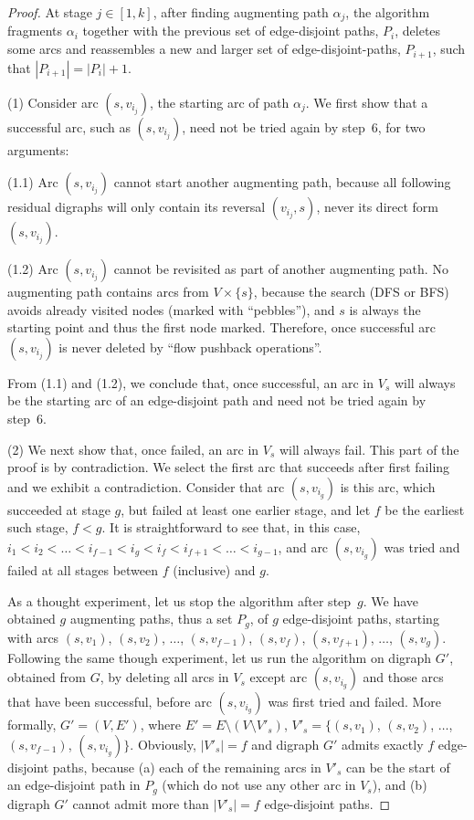 \documentclass[preliminary,copyright,creativecommons]{eptcs}
\theoremstyle{remark}
\begin{document}
\begin{proof}
At stage $j \in [1,k]$, after finding augmenting path $\alpha_j$, 
the algorithm fragments $\alpha_i$ 
together with the previous set of edge-disjoint paths, $P_i$, 
deletes some arcs and reassembles a new and larger set of edge-disjoint-paths, $P_{i+1}$,
such that $| P_{i+1} | = | P_i | + 1$.

(1) Consider arc $(s,v_{i_j})$, the starting arc of path $\alpha_j$.
We first show that a successful arc, such as $(s,v_{i_j})$, 
need not be tried again by step~6, for two arguments:

(1.1) Arc $(s,v_{i_j})$ cannot start another augmenting path, 
because all following residual digraphs will only contain 
its reversal $(v_{i_j},s)$, never its direct form $(s,v_{i_j})$.

(1.2) Arc $(s,v_{i_j})$ cannot be revisited as part of another augmenting path.
No augmenting path contains arcs from $V \times \{s\}$, 
because the search (DFS or BFS) avoids already visited nodes (marked with ``pebbles''), 
and $s$ is always the starting point and thus the first node marked.
Therefore, once successful arc $(s,v_{i_j})$ is never deleted 
by ``flow pushback operations''.

From (1.1) and (1.2), we conclude that, once successful, an arc in $V_s$ 
will always be the starting arc of an edge-disjoint path
and need not be tried again by step~6.

\medskip

(2) We next show that, once failed, an arc in $V_s$ will always fail.
This part of the proof is by contradiction.
We select the first arc that succeeds after first failing and we exhibit a contradiction.
Consider that arc $(s,v_{i_g})$ is this arc, which succeeded at stage $g$,
but failed at least one earlier stage, and let $f$ be the earliest such stage, $f < g$.
It is straightforward to see that, in this case, 
$i_1 < i_2 < \dots < i_{f-1} < i_g < i_f < i_{f+1} < \dots < i_{g-1}$,
and arc $(s,v_{i_g})$ was tried and failed at all stages 
between $f$ (inclusive) and $g$.

As a thought experiment, let us stop the algorithm after step~$g$.
We have obtained $g$ augmenting paths, thus a set $P_g$, of $g$ edge-disjoint paths,
starting with arcs $(s,v_1)$, $(s,v_2)$, $\dots$, 
$(s,v_{f-1})$, $(s,v_f)$, $(s,v_{f+1})$, $\dots$, $(s,v_g)$.
Following the same though experiment, let us run the algorithm on 
digraph $G'$, obtained from $G$, by deleting all arcs in $V_s$ 
except arc $(s,v_{i_g})$ and those arcs that have been successful, 
before arc $(s,v_{i_g})$ was first tried and failed.
More formally, $G' = (V,E')$, where
$E' = E \setminus (V \setminus V'_s)$, 
$V'_s = \{(s,v_1)$, $(s,v_2)$, $\dots$, $(s,v_{f-1})$, $(s,v_{i_g})\}$.
Obviously, $| V'_s | = f $ and digraph $G'$ admits exactly $f$ edge-disjoint paths, 
because
(a) each of the remaining arcs in $V'_s$ can be the start 
of an edge-disjoint path in $P_g$ (which do not use any other arc in $V_s$), and  
(b) digraph $G'$ cannot admit more than $| V'_s | = f $ edge-disjoint paths.


\end{proof}
\end{document}
